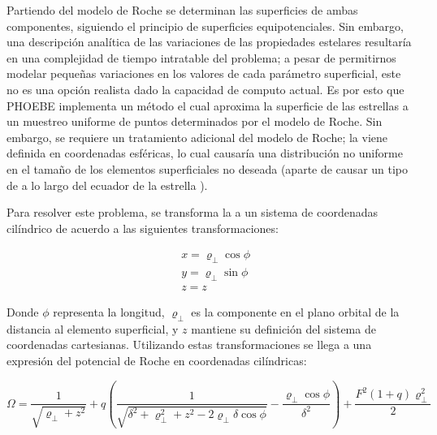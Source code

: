 Partiendo del modelo de Roche se determinan las superficies de ambas
componentes, siguiendo el principio de superficies equipotenciales. Sin embargo,
una descripción analítica de las variaciones de las propiedades estelares
resultaría en una complejidad de tiempo intratable del problema; a pesar de
permitirnos modelar pequeñas variaciones en los valores de cada parámetro
superficial, este no es una opción realista dado la capacidad de computo actual.
Es por esto que PHOEBE implementa un método el cual aproxima la superficie de
las estrellas a un muestreo uniforme de puntos determinados por el modelo de
Roche. Sin embargo, se requiere un tratamiento adicional del modelo de Roche; la
 viene definida en coordenadas
esféricas, lo cual causaría una distribución no uniforme en el tamaño de los
elementos superficiales no deseada (aparte de causar un tipo de 
a lo largo del ecuador de la estrella ).

Para resolver este problema, se transforma la
 a un sistema de coordenadas
cilíndrico de acuerdo a las siguientes transformaciones:

\begin{eqfloat}[!ht]
	\centering
	\begin{equation}
		\begin{split}
			& x = \varrho_{\perp} \cos{\phi} \\
			& y = \varrho_{\perp} \sin{\phi} \\
			& z = z
		\end{split}
	\end{equation}
\end{eqfloat}

Donde $\phi$ representa la longitud, $\varrho_{\perp}$ es la componente en el
plano orbital de la distancia al elemento superficial, y $z$ mantiene su
definición del sistema de coordenadas cartesianas. Utilizando estas
transformaciones se llega a una expresión del potencial de Roche en coordenadas
cilíndricas:


\begin{eqfloat}[!ht]
	\centering
	\begin{equation}
		\Omega = \frac{1}{\sqrt{\varrho_{\perp} + z^2}} + q \left(\frac{1}{\sqrt{\delta^2 + \varrho_{\perp}^2 + z^2 - 2 \varrho_{\perp} \delta \cos{\phi}}} - \frac{\varrho_{\perp} \cos{\phi}}{\delta^2} \right) + \frac{F^2 \left(1 + q\right) \varrho_{\perp}^2}{2}
	\end{equation}
	\blankcaption
	\label{ecuacionRocheCilindrica}
\end{eqfloat}

